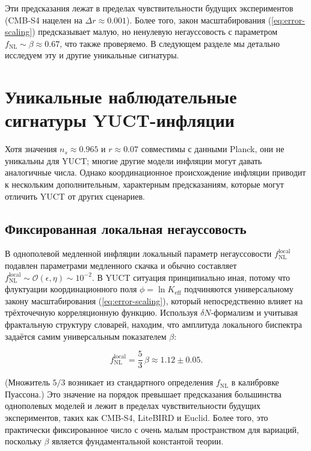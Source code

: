 \documentclass[12pt,a4paper]{article}
\theoremstyle{remark}
\newcommand{\Keff}{K_{\mathrm{eff}}}
\begin{document}
	Эти предсказания лежат в пределах чувствительности будущих экспериментов (CMB‑S4 нацелен на $\Delta r \approx 0.001$). Более того, закон масштабирования (\ref{eq:error-scaling}) предсказывает малую, но ненулевую негауссовость с параметром $f_{\mathrm{NL}} \sim \beta \approx 0.67$, что также проверяемо. В следующем разделе мы детально исследуем эту и другие уникальные сигнатуры.
	
	\section{Уникальные наблюдательные сигнатуры YUCT-инфляции}
	\label{sec:signatures}
	
	Хотя значения $n_s \approx 0.965$ и $r \approx 0.07$ совместимы с данными Planck, они не уникальны для YUCT; многие другие модели инфляции могут давать аналогичные числа. Однако координационное происхождение инфляции приводит к нескольким дополнительным, характерным предсказаниям, которые могут отличить YUCT от других сценариев.
	
	\subsection{Фиксированная локальная негауссовость}
	
	В однополевой медленной инфляции локальный параметр негауссовости $f_{\text{NL}}^{\text{local}}$ подавлен параметрами медленного скачка и обычно составляет $f_{\text{NL}}^{\text{local}} \sim \mathcal{O}(\epsilon, \eta) \sim 10^{-2}$. В YUCT ситуация принципиально иная, потому что флуктуации координационного поля $\phi = \ln \Keff$ подчиняются универсальному закону масштабирования (\ref{eq:error-scaling}), который непосредственно влияет на трёхточечную корреляционную функцию. Используя $\delta N$‑формализм и учитывая фрактальную структуру словарей, находим, что амплитуда локального биспектра задаётся самим универсальным показателем $\beta$:
	
	\begin{equation}
		f_{\text{NL}}^{\text{local}} = \frac{5}{3}\,\beta \approx 1.12 \pm 0.05.
		\label{eq:fnl}
	\end{equation}
	
	(Множитель $5/3$ возникает из стандартного определения $f_{\text{NL}}$ в калибровке Пуассона.) Это значение на порядок превышает предсказания большинства однополевых моделей и лежит в пределах чувствительности будущих экспериментов, таких как CMB‑S4, LiteBIRD и Euclid. Более того, это практически фиксированное число с очень малым пространством для вариаций, поскольку $\beta$ является фундаментальной константой теории.
	
\end{document}
